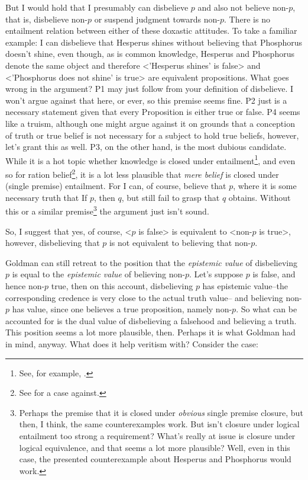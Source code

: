 \documentclass[12pt,numbers=noenddot]{scrartcl}
\begin{document}
But I would hold that I presumably can disbelieve $p$ and also not believe non-$p$, that is, disbelieve non-$p$ or suspend judgment towards non-$p$. There is no entailment relation between either of these doxastic attitudes. To take a familiar example: I can disbelieve that Hesperus shines without believing that Phosphorus doesn't shine, even though, as is common knowledge, Hesperus and Phosphorus denote the same object and therefore <'Hesperus shines' is false> and <'Phosphorus does not shine' is true> are equivalent propositions. What goes wrong in the argument? P1 may just follow from your definition of disbelieve. I won't argue against that here, or ever, so this premise seems fine. P2 just is a necessary statement given that every Proposition is either true or false. P4 seems like a truism, although one might argue against it on grounds that a conception of truth or true belief is not necessary for a subject to hold true beliefs, however, let's grant this as well. P3, on the other hand, is the most dubious candidate. While it is a hot topic whether knowledge is closed under entailment\footnote{See, for example, \textcite{Dretske2005-DREIKC}.}, and even so for ration belief\footnote{See \textcite{KyburgJr1970-KYBC-2} for a case against.}, it is a lot less plausible that \emph{mere belief} is closed under (single premise) entailment. For I can, of course, believe that $p$, where it is some necessary truth that If $p$, then $q$, but still fail to grasp that $q$ obtains. Without this or a similar premise\footnote{Perhaps the premise that it is closed under \emph{obvious} single premise closure, but then, I think, the same counterexamples work. But isn't closure under logical entailment too strong a requirement? What's really at issue is closure under logical equivalence, and that seems a lot more plausible? Well, even in this case, the presented counterexample about Hesperus and Phosphorus would work.} the argument just isn't sound.

So, I suggest that yes, of course, <$p$ is false> is equivalent to <non-$p$ is true>, however, disbelieving that $p$ is not equivalent to believing that non-$p$.

Goldman can still retreat to the position that the \emph{epistemic value} of disbelieving $p$ is equal to the \emph{epistemic value} of believing non-$p$. Let's suppose $p$ is false, and hence non-$p$ true, then on this account, disbelieving $p$ has epistemic value–the corresponding credence is very close to the actual truth value– and believing non-$p$ has value, since one believes a true proposition, namely non-$p$. So what can be accounted for is the dual value of disbelieving a falsehood and believing a truth. This position seems a lot more plausible, then. Perhaps it is what Goldman had in mind, anyway. What does it help veritism with? Consider the case:
\end{document}
